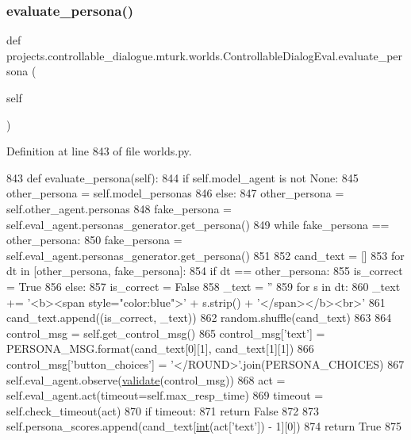\subsubsection{\texorpdfstring{evaluate\+\_\+persona()}{evaluate\_persona()}}
{\footnotesize\ttfamily def projects.\+controllable\+\_\+dialogue.\+mturk.\+worlds.\+Controllable\+Dialog\+Eval.\+evaluate\+\_\+persona (\begin{DoxyParamCaption}\item[{}]{self }\end{DoxyParamCaption})}



Definition at line 843 of file worlds.\+py.


\begin{DoxyCode}
843     \textcolor{keyword}{def }evaluate\_persona(self):
844         \textcolor{keywordflow}{if} self.model\_agent \textcolor{keywordflow}{is} \textcolor{keywordflow}{not} \textcolor{keywordtype}{None}:
845             other\_persona = self.model\_personas
846         \textcolor{keywordflow}{else}:
847             other\_persona = self.other\_agent.personas
848         fake\_persona = self.eval\_agent.personas\_generator.get\_persona()
849         \textcolor{keywordflow}{while} fake\_persona == other\_persona:
850             fake\_persona = self.eval\_agent.personas\_generator.get\_persona()
851 
852         cand\_text = []
853         \textcolor{keywordflow}{for} dt \textcolor{keywordflow}{in} [other\_persona, fake\_persona]:
854             \textcolor{keywordflow}{if} dt == other\_persona:
855                 is\_correct = \textcolor{keyword}{True}
856             \textcolor{keywordflow}{else}:
857                 is\_correct = \textcolor{keyword}{False}
858             \_text = \textcolor{stringliteral}{''}
859             \textcolor{keywordflow}{for} s \textcolor{keywordflow}{in} dt:
860                 \_text += \textcolor{stringliteral}{'<b><span style="color:blue">'} + s.strip() + \textcolor{stringliteral}{'</span></b><br>'}
861             cand\_text.append((is\_correct, \_text))
862         random.shuffle(cand\_text)
863 
864         control\_msg = self.get\_control\_msg()
865         control\_msg[\textcolor{stringliteral}{'text'}] = PERSONA\_MSG.format(cand\_text[0][1], cand\_text[1][1])
866         control\_msg[\textcolor{stringliteral}{'button\_choices'}] = \textcolor{stringliteral}{'</ROUND>'}.join(PERSONA\_CHOICES)
867         self.eval\_agent.observe(\hyperlink{namespaceparlai_1_1core_1_1worlds_afc3fad603b7bce41dbdc9cdc04a9c794}{validate}(control\_msg))
868         act = self.eval\_agent.act(timeout=self.max\_resp\_time)
869         timeout = self.check\_timeout(act)
870         \textcolor{keywordflow}{if} timeout:
871             \textcolor{keywordflow}{return} \textcolor{keyword}{False}
872 
873         self.persona\_scores.append(cand\_text[\hyperlink{namespacelanguage__model_1_1eval__ppl_a7d12ee00479673c5c8d1f6d01faa272a}{int}(act[\textcolor{stringliteral}{'text'}]) - 1][0])
874         \textcolor{keywordflow}{return} \textcolor{keyword}{True}
875 
\end{DoxyCode}
